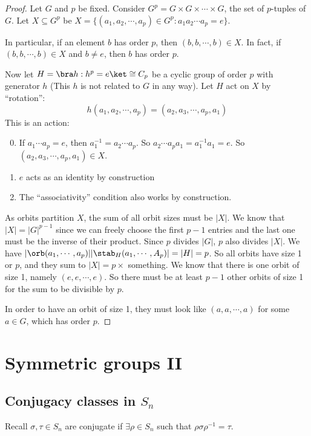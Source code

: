 \documentclass[a4paper]{article}
\begin{document}
\begin{proof}
  Let $G$ and $p$ be fixed. Consider $G^p = G\times G\times \cdots \times G$, the set of $p$-tuples of $G$. Let $X \subseteq G^p$ be $X = \{(a_1, a_2, \cdots, a_p)\in G^p: a_1a_2\cdots a_p = e\}$.

  In particular, if an element $b$ has order $p$, then $(b, b, \cdots, b)\in X$. In fact, if $(b, b, \cdots, b)\in X$ and $b\not= e$, then $b$ has order $p$.

  Now let $H = \bra h: h^p = e\ket\cong C_p$ be a cyclic group of order $p$ with generator $h$ (This $h$ is not related to $G$ in any way). Let $H$ act on $X$ by ``rotation'':
  \[
    h(a_1, a_2, \cdots, a_p) = (a_2, a_3, \cdots, a_p, a_1)
  \]
  This is an action:
  \begin{enumerate}[label=\arabic{*}.]
      \setcounter{enumi}{-1}
    \item If $a_1\cdots a_p = e$, then $a_1^{-1} = a_2\cdots a_p$. So $a_2\cdots a_pa_1 = a_1^{-1}a_1 = e$. So $(a_2, a_3, \cdots, a_p, a_1)\in X$.
    \item $e$ acts as an identity by construction
    \item The ``associativity'' condition also works by construction.
  \end{enumerate}

  As orbits partition $X$, the sum of all orbit sizes must be $|X|$. We know that $|X| = |G|^{p - 1}$ since we can freely choose the first $p - 1$ entries and the last one must be the inverse of their product. Since $p$ divides $|G|$, $p$ also divides $|X|$. We have $|\orb(a_1, \cdots , a_p)||\stab_H(a_1, \cdots, A_p)| = |H| = p$. So all orbits have size 1 or $p$, and they sum to $|X| = p\times$ something. We know that there is one orbit of size 1, namely $(e, e, \cdots, e)$. So there must be at least $p - 1$ other orbits of size 1 for the sum to be divisible by $p$.

  In order to have an orbit of size 1, they must look like ${(a, a, \cdots, a)}$  for some $a\in G$, which has order $p$.
\end{proof}

\section{Symmetric groups II}
\subsection{Conjugacy classes in \texorpdfstring{$S_n$}{Sn}}
Recall $\sigma, \tau\in S_n$ are conjugate if $\exists \rho\in S_n$ such that $\rho \sigma\rho^{-1} = \tau$.
\end{document}
